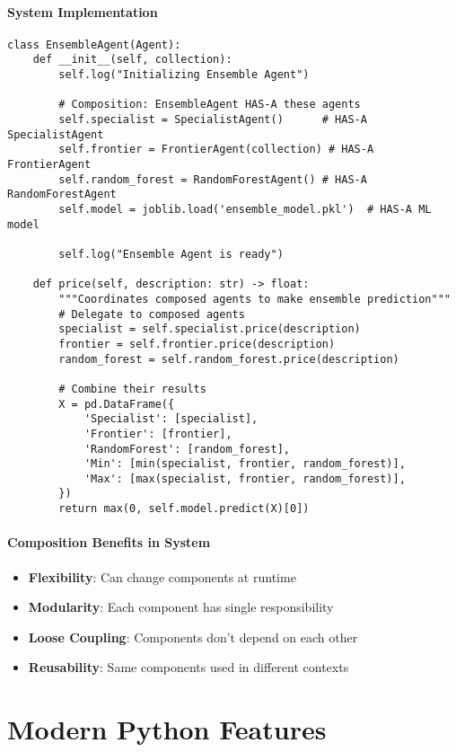 \paragraph{System Implementation}
\begin{lstlisting}[caption=EnsembleAgent Composition Pattern]
class EnsembleAgent(Agent):
    def __init__(self, collection):
        self.log("Initializing Ensemble Agent")
        
        # Composition: EnsembleAgent HAS-A these agents
        self.specialist = SpecialistAgent()      # HAS-A SpecialistAgent
        self.frontier = FrontierAgent(collection) # HAS-A FrontierAgent
        self.random_forest = RandomForestAgent() # HAS-A RandomForestAgent
        self.model = joblib.load('ensemble_model.pkl')  # HAS-A ML model
        
        self.log("Ensemble Agent is ready")

    def price(self, description: str) -> float:
        """Coordinates composed agents to make ensemble prediction"""
        # Delegate to composed agents
        specialist = self.specialist.price(description)
        frontier = self.frontier.price(description)
        random_forest = self.random_forest.price(description)
        
        # Combine their results
        X = pd.DataFrame({
            'Specialist': [specialist],
            'Frontier': [frontier],
            'RandomForest': [random_forest],
            'Min': [min(specialist, frontier, random_forest)],
            'Max': [max(specialist, frontier, random_forest)],
        })
        return max(0, self.model.predict(X)[0])
\end{lstlisting}

\paragraph{Composition Benefits in System}
\begin{itemize}
\item \textbf{Flexibility}: Can change components at runtime
\item \textbf{Modularity}: Each component has single responsibility
\item \textbf{Loose Coupling}: Components don't depend on each other
\item \textbf{Reusability}: Same components used in different contexts
\end{itemize}

\section{Modern Python Features}

